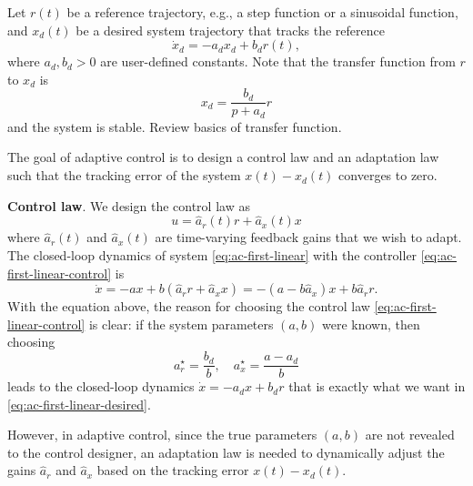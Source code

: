 \documentclass[
]{book}
\theoremstyle{definition}
\theoremstyle{definition}
\theoremstyle{definition}
\theoremstyle{definition}
\theoremstyle{remark}
\begin{document}
Let \(r(t)\) be a reference trajectory, e.g., a step function or a sinusoidal function, and \(x_d(t)\) be a desired system trajectory that tracks the reference
\begin{equation}
\dot{x}_d = - a_d x_d + b_d r(t),
\label{eq:ac-first-linear-desired}
\end{equation}
where \(a_d,b_d > 0\) are user-defined constants. Note that the transfer function from \(r\) to \(x_d\) is
\[
x_d = \frac{b_d}{p + a_d} r
\]
and the system is stable. {Review basics of transfer function.}

The goal of adaptive control is to design a control law and an adaptation law such that the tracking error of the system \(x(t) - x_d(t)\) converges to zero.

\textbf{Control law}. We design the control law as
\begin{equation}
u = \hat{a}_r(t) r + \hat{a}_x(t) x 
\label{eq:ac-first-linear-control}
\end{equation}
where \(\hat{a}_r(t)\) and \(\hat{a}_x(t)\) are time-varying feedback gains that we wish to adapt. The closed-loop dynamics of system \eqref{eq:ac-first-linear} with the controller \eqref{eq:ac-first-linear-control} is
\[
\dot{x} = - a x + b (\hat{a}_r r + \hat{a}_x x) = - (a - b \hat{a}_x) x + b \hat{a}_r r. 
\]
With the equation above,
the reason for choosing the control law \eqref{eq:ac-first-linear-control} is clear: if the system parameters \((a,b)\) were known, then choosing
\begin{equation}
a_r^\star = \frac{b_d}{b}, \quad a_x^\star = \frac{a - a_d}{b}
\label{eq:ac-first-linear-optimal-gain}
\end{equation}
leads to the closed-loop dynamics \(\dot{x} = - a_d x + b_d r\) that is exactly what we want in \eqref{eq:ac-first-linear-desired}.

However, in adaptive control, since the true parameters \((a,b)\) are not revealed to the control designer, an adaptation law is needed to dynamically adjust the gains \(\hat{a}_r\) and \(\hat{a}_x\) based on the tracking error \(x(t) - x_d(t)\).
\end{document}
